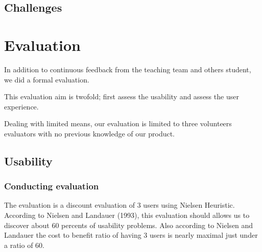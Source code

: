 \documentclass[11pt,a4paper]{article}
\begin{document}




\subsection{Challenges}







\section{Evaluation} \label{eval}

In addition to continuous feedback from the teaching team and others student, we did a formal evaluation.

This evaluation aim is twofold; first assess the usability and assess the user experience.

Dealing with limited means, our evaluation is limited to three volunteers evaluators with no previous knowledge of our product.





\subsection{Usability}

\subsubsection{Conducting evaluation}

The evaluation is a discount evaluation of 3 users using Nielsen Heuristic. According to Nielsen and Landauer (1993), this evaluation should allows us to discover about 60 percents of usability problems. Also according to Nielsen and Landauer the cost to benefit ratio of having 3 users is nearly maximal just under a ratio of 60.
\end{document}
